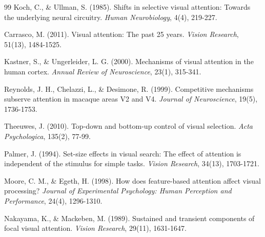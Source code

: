 \documentclass[a4paper, 11pt]{article}
\begin{document}
\begin{thebibliography}{99}
Koch, C., \& Ullman, S. (1985). Shifts in selective visual attention: Towards the underlying neural circuitry. \textit{Human Neurobiology}, 4(4), 219-227.

Carrasco, M. (2011). Visual attention: The past 25 years. \textit{Vision Research}, 51(13), 1484-1525.

Kastner, S., \& Ungerleider, L. G. (2000). Mechanisms of visual attention in the human cortex. \textit{Annual Review of Neuroscience}, 23(1), 315-341.

Reynolds, J. H., Chelazzi, L., \& Desimone, R. (1999). Competitive mechanisms subserve attention in macaque areas V2 and V4. \textit{Journal of Neuroscience}, 19(5), 1736-1753.

Theeuwes, J. (2010). Top-down and bottom-up control of visual selection. \textit{Acta Psychologica}, 135(2), 77-99.

Palmer, J. (1994). Set-size effects in visual search: The effect of attention is independent of the stimulus for simple tasks. \textit{Vision Research}, 34(13), 1703-1721.

Moore, C. M., \& Egeth, H. (1998). How does feature-based attention affect visual processing? \textit{Journal of Experimental Psychology: Human Perception and Performance}, 24(4), 1296-1310.

Nakayama, K., \& Mackeben, M. (1989). Sustained and transient components of focal visual attention. \textit{Vision Research}, 29(11), 1631-1647.

\end{thebibliography}
\end{document}
